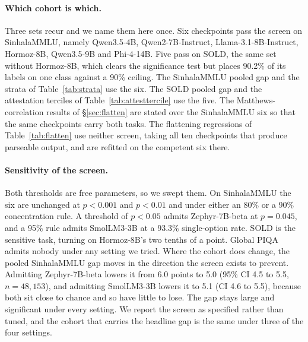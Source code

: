 \documentclass{article}
\begin{document}
\paragraph{Which cohort is which.} Three sets recur and we name them here once. Six
checkpoints pass the screen on SinhalaMMLU, namely Qwen3.5-4B, Qwen2-7B-Instruct,
Llama-3.1-8B-Instruct, Hormoz-8B, Qwen3.5-9B and Phi-4-14B. Five pass on SOLD, the same
set without Hormoz-8B, which clears the significance test but places 90.2\% of its labels
on one class against a 90\% ceiling. The SinhalaMMLU pooled gap and the strata of
Table~\ref{tab:strata} use the six. The SOLD pooled gap and the attestation terciles of
Table~\ref{tab:attesttercile} use the five. The Matthews-correlation results of
\S\ref{sec:flatten} are stated over the SinhalaMMLU six so that the same checkpoints
carry both tasks. The flattening regressions of Table~\ref{tab:flatten} use neither
screen, taking all ten checkpoints that produce parseable output, and are refitted on the
competent six there.

\paragraph{Sensitivity of the screen.} Both thresholds are free parameters, so we swept
them. On SinhalaMMLU the six are unchanged at $p < 0.001$ and $p < 0.01$ and under either
an 80\% or a 90\% concentration rule. A threshold of $p < 0.05$ admits Zephyr-7B-beta at $p = 0.045$,
and a 95\% rule admits SmolLM3-3B at a 93.3\% single-option rate. SOLD is the sensitive
task, turning on Hormoz-8B's two tenths of a point. Global PIQA admits nobody under any
setting we tried. Where the cohort does change, the pooled SinhalaMMLU gap moves in the
direction the screen exists to prevent. Admitting Zephyr-7B-beta lowers it from 6.0 points
to 5.0 (95\% CI 4.5 to 5.5, $n = 48{,}153$), and admitting SmolLM3-3B lowers it to 5.1
(CI 4.6 to 5.5), because both sit close to chance and so have little to lose. The gap stays
large and significant under every setting. We report the screen as specified rather than
tuned, and the cohort that carries the headline gap is the same under three of the four
settings.
\end{document}
